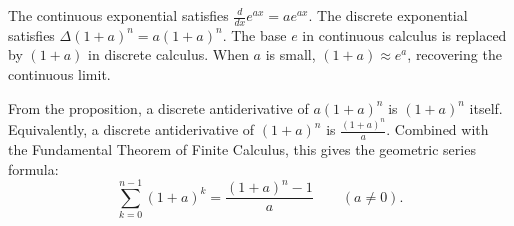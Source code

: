 \begin{remark*}[Analogy]
The continuous exponential satisfies \(\tfrac{d}{dx}e^{ax} = ae^{ax}\).
The discrete exponential satisfies \(\Delta(1+a)^n = a(1+a)^n\). The
base \(e\) in continuous calculus is replaced by \((1+a)\) in discrete
calculus. When \(a\) is small, \((1+a) \approx e^a\), recovering the
continuous limit.
\end{remark*}

\begin{remark*}[Antiderivative]
From the proposition, a discrete antiderivative of \(a(1+a)^n\) is
\((1+a)^n\) itself. Equivalently, a discrete antiderivative of \((1+a)^n\)
is \(\tfrac{(1+a)^n}{a}\). Combined with the Fundamental Theorem of Finite
Calculus, this gives the geometric series formula:
\[
\sum_{k=0}^{n-1}(1+a)^k
= \frac{(1+a)^n - 1}{a}
\qquad (a \ne 0).
\]
\end{remark*}
